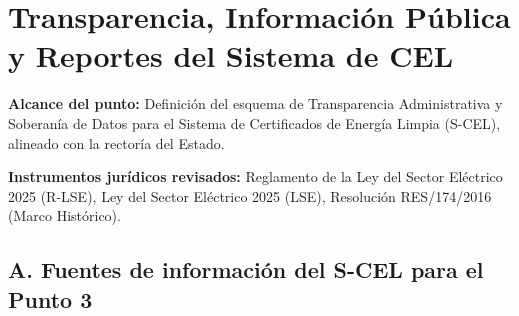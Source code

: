\documentclass{cel}
\begin{document}
\section*{Transparencia, Información Pública y Reportes del Sistema de CEL}
\nopagebreak

\textbf{Alcance del punto:} Definición del esquema de Transparencia Administrativa y Soberanía de Datos para el Sistema de Certificados de Energía Limpia (S-CEL), alineado con la rectoría del Estado.

\textbf{Instrumentos jurídicos revisados:} Reglamento de la Ley del Sector Eléctrico 2025 (R-LSE), Ley del Sector Eléctrico 2025 (LSE), Resolución RES/174/2016 (Marco Histórico).


\vspace{0.4cm}
\subsection{A. Fuentes de información del S-CEL para el Punto 3}
\nopagebreak
\end{document}
